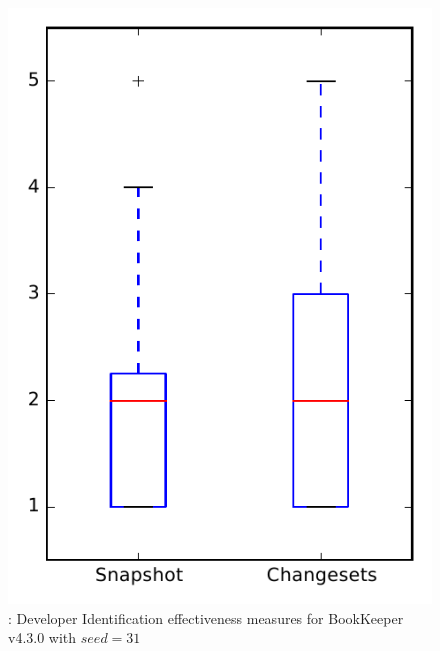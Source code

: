 
\begin{figure}
\centering
\includegraphics[height=0.4\textheight]{figures/dit_seed/rq1_bookkeeper_31}
\caption{\rtwo: Developer Identification effectiveness measures for BookKeeper v4.3.0 with $seed=31$}
\label{fig:dit_seed:rq1:bookkeeper}
\end{figure}
